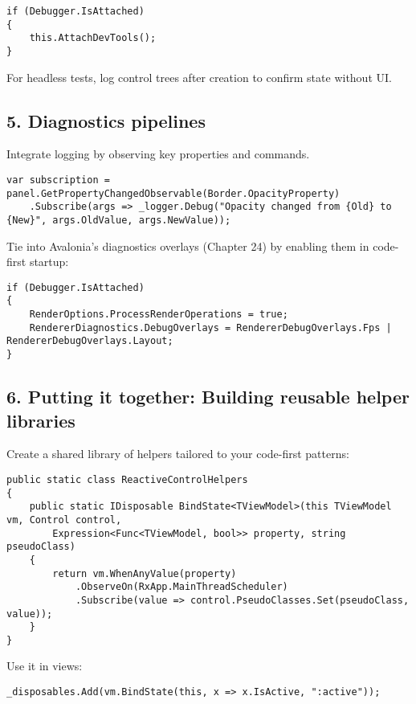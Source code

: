 \begin{lstlisting}
if (Debugger.IsAttached)
{
    this.AttachDevTools();
}
\end{lstlisting}

For headless tests, log control trees after creation to confirm state
without UI.

\subsection{5. Diagnostics pipelines}\label{diagnostics-pipelines}

Integrate logging by observing key properties and commands.

\begin{lstlisting}
var subscription = panel.GetPropertyChangedObservable(Border.OpacityProperty)
    .Subscribe(args => _logger.Debug("Opacity changed from {Old} to {New}", args.OldValue, args.NewValue));
\end{lstlisting}

Tie into Avalonia's diagnostics overlays (Chapter 24) by enabling them
in code-first startup:

\begin{lstlisting}
if (Debugger.IsAttached)
{
    RenderOptions.ProcessRenderOperations = true;
    RendererDiagnostics.DebugOverlays = RendererDebugOverlays.Fps | RendererDebugOverlays.Layout;
}
\end{lstlisting}

\subsection{6. Putting it together: Building reusable helper
libraries}\label{putting-it-together-building-reusable-helper-libraries}

Create a shared library of helpers tailored to your code-first patterns:

\begin{lstlisting}
public static class ReactiveControlHelpers
{
    public static IDisposable BindState<TViewModel>(this TViewModel vm, Control control,
        Expression<Func<TViewModel, bool>> property, string pseudoClass)
    {
        return vm.WhenAnyValue(property)
            .ObserveOn(RxApp.MainThreadScheduler)
            .Subscribe(value => control.PseudoClasses.Set(pseudoClass, value));
    }
}
\end{lstlisting}

Use it in views:

\begin{lstlisting}
_disposables.Add(vm.BindState(this, x => x.IsActive, ":active"));
\end{lstlisting}

